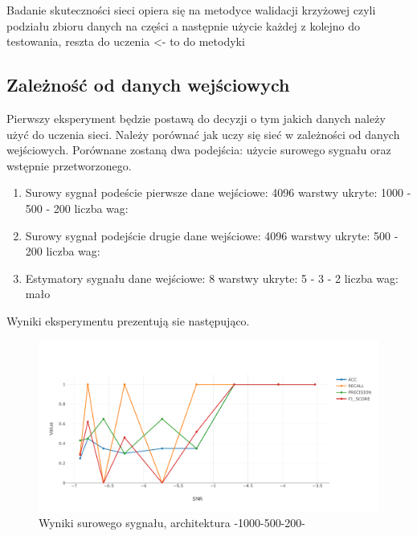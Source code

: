 \documentclass[12pt, a4paper, oneside]{article}
\begin{document}
	Badanie skuteczności sieci opiera się na metodyce walidacji krzyżowej czyli podziału zbioru danych na części a następnie użycie każdej z kolejno do testowania, reszta do uczenia <- to do metodyki
	

	\subsection{Zależność od danych wejściowych}
	Pierwszy eksperyment będzie postawą do decyzji o tym jakich danych należy użyć do uczenia sieci. Należy porównać jak uczy się sieć w zależności od danych wejściowych. Porównane zostaną dwa podejścia: użycie surowego sygnału oraz wstępnie przetworzonego. 
	
	\begin{enumerate}
		\item Surowy sygnał podeście pierwsze
			\subitem dane wejściowe: 4096
			\subitem warstwy ukryte: 1000 - 500 - 200
			\subitem liczba wag: 
		
		\item Surowy sygnał podejście drugie
			\subitem dane wejściowe: 4096
			\subitem warstwy ukryte: 500 - 200
			\subitem liczba wag:
			
		\item Estymatory sygnału
			\subitem dane wejściowe: 8
			\subitem warstwy ukryte: 5 - 3 - 2
			\subitem liczba wag: mało
	\end{enumerate}
	
	Wyniki eksperymentu prezentują sie następująco.
	

	\begin{figure}[H]
		\centering
		\includegraphics[width=14cm]{images/nn_full_1000_500_200.pdf}
		\caption{Wyniki surowego sygnału, architektura -1000-500-200-}
	\end{figure}
\end{document}
